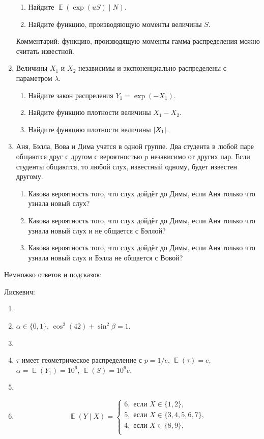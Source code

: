 \documentclass[12pt]{article}
\DeclarePairedDelimiter{\abs}{\lvert}{\rvert}
\DeclareMathOperator{\E}{\mathbb{E}}
\begin{document}
\begin{enumerate}
\begin{enumerate}
    \item Найдите $\E(\exp(u S) \mid N)$.
    \item Найдите функцию, производяющую моменты величины $S$.
\end{enumerate}

Комментарий: функцию, производящую моменты гамма-распределения можно считать известной.

\item Величины $X_1$ и $X_2$ независимы и экспоненциально распределены с параметром $\lambda$. 
\begin{enumerate}
    \item Найдите закон распреления $Y_1 = \exp(-X_1)$.
    \item Найдите функцию плотности величины $X_1 - X_2$.
    \item Найдите функцию плотности величины $\abs{X_1}$.
\end{enumerate}


\item Аня, Бэлла, Вова и Дима учатся в одной группе. 
Два студента в любой паре общаются друг с другом с вероятностью $p$ независимо от других пар.
Если студенты общаются, то любой слух, известный одному, будет известен другому. 
\begin{enumerate}
    \item Какова вероятность того, что слух дойдёт до Димы, если Аня только что узнала новый слух?
    \item Какова вероятность того, что слух дойдёт до Димы, если Аня только что узнала новый слух и не общается с Бэллой?
    \item Какова вероятность того, что слух дойдёт до Димы, если Аня только что узнала новый слух и Бэлла не общается с Вовой?
\end{enumerate}

\end{enumerate}


Немножко ответов и подсказок:



Лискевич:
\begin{enumerate}
    \item 
    \item $\alpha \in \{0, 1\}$, $\cos^2(42) + \sin^2\beta = 1$.
    \item 
    \item $\tau$ имеет геометрическое распределение с $p = 1/e$, $\E(\tau) = e$, $\alpha = \E(Y_1) = 10^6$, $\E(S) = 10^6e$.
    \item 
    \item 
\[
\E(Y \mid X) = \begin{cases}
    6, \text{ если } X \in \{1, 2\},\\
    5, \text{ если } X \in \{3, 4, 5, 6, 7\},\\
    4, \text{ если } X \in \{8, 9\},\\
\end{cases}
\]
\end{enumerate}
\end{document}
